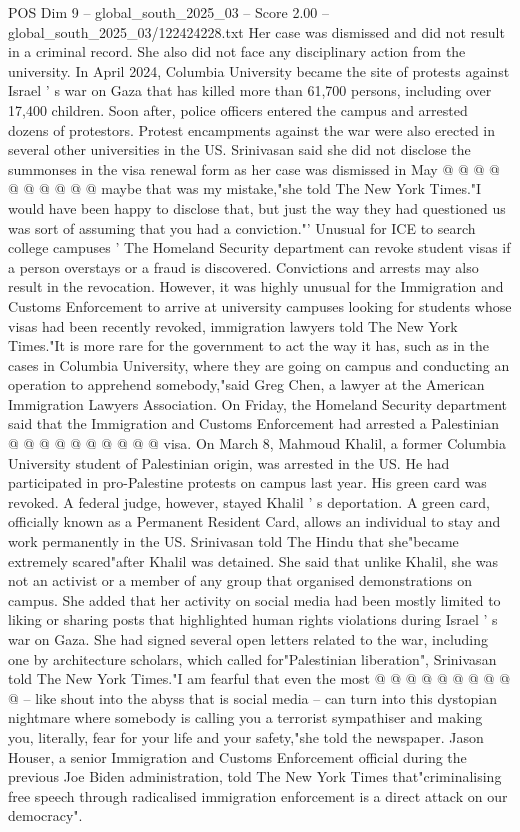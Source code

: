 \begin{textsample}{POS Dim 9 – global\_south\_2025\_03 – Score 2.00 – global\_south\_2025\_03/122424228.txt}
Her case was dismissed and did not result in a criminal record.
She also did not face any disciplinary action from the university.
In April 2024, Columbia University became the site of protests against Israel ' s war on Gaza that has killed more than 61,700 persons, including over 17,400 children.
Soon after, police officers entered the campus and arrested dozens of protestors.
Protest encampments against the war were also erected in several other universities in the US.
Srinivasan said she did not disclose the summonses in the visa renewal form as her case was dismissed in May @ @ @ @ @ @ @ @ @ @ maybe that was my mistake,"she told The New York Times."I would have been happy to disclose that, but just the way they had questioned us was sort of assuming that you had a conviction."' Unusual for ICE to search college campuses ' The Homeland Security department can revoke student visas if a person overstays or a fraud is discovered.
Convictions and arrests may also result in the revocation.
However, it was highly unusual for the Immigration and Customs Enforcement to arrive at university campuses looking for students whose visas had been recently revoked, immigration lawyers told The New York Times."It is more rare for the government to act the way it has, such as in the cases in Columbia University, where they are going on campus and conducting an operation to apprehend somebody,"said Greg Chen, a lawyer at the American Immigration Lawyers Association.
On Friday, the Homeland Security department said that the Immigration and Customs Enforcement had arrested a Palestinian @ @ @ @ @ @ @ @ @ @ visa.
On March 8, Mahmoud Khalil, a former Columbia University student of Palestinian origin, was arrested in the US.
He had participated in pro-Palestine protests on campus last year.
His green card was revoked.
A federal judge, however, stayed Khalil ' s deportation.
A green card, officially known as a Permanent Resident Card, allows an individual to stay and work permanently in the US.
Srinivasan told The Hindu that she"became extremely scared"after Khalil was detained.
She said that unlike Khalil, she was not an activist or a member of any group that organised demonstrations on campus.
She added that her activity on social media had been mostly limited to liking or sharing posts that highlighted human rights violations during Israel ' s war on Gaza.
She had signed several open letters related to the war, including one by architecture scholars, which called for"Palestinian liberation", Srinivasan told The New York Times."I am fearful that even the most @ @ @ @ @ @ @ @ @ @ -- like shout into the abyss that is social media -- can turn into this dystopian nightmare where somebody is calling you a terrorist sympathiser and making you, literally, fear for your life and your safety,"she told the newspaper.
Jason Houser, a senior Immigration and Customs Enforcement official during the previous Joe Biden administration, told The New York Times that"criminalising free speech through radicalised immigration enforcement is a direct attack on our democracy".

\end{textsample}
